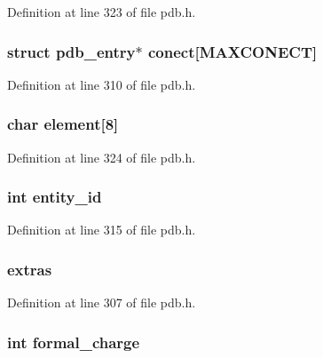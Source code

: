 Definition at line 323 of file pdb.\-h.

\hypertarget{structpdb__entry_a6115e9a0a6109e8dce256fa256fd3dc9}{
\subsubsection[{conect}]{\setlength{\rightskip}{0pt plus 5cm}struct {\bf pdb\-\_\-entry}$\ast$ conect\mbox{[}{\bf M\-A\-X\-C\-O\-N\-E\-C\-T}\mbox{]}}}\label{structpdb__entry_a6115e9a0a6109e8dce256fa256fd3dc9}


Definition at line 310 of file pdb.\-h.

\hypertarget{structpdb__entry_a780be116469a48c4b1d531bafb335f99}{
\subsubsection[{element}]{\setlength{\rightskip}{0pt plus 5cm}char element\mbox{[}8\mbox{]}}}\label{structpdb__entry_a780be116469a48c4b1d531bafb335f99}


Definition at line 324 of file pdb.\-h.

\hypertarget{structpdb__entry_add86dc86465724759eb6939ffa489005}{
\subsubsection[{entity\-\_\-id}]{\setlength{\rightskip}{0pt plus 5cm}int entity\-\_\-id}}\label{structpdb__entry_add86dc86465724759eb6939ffa489005}


Definition at line 315 of file pdb.\-h.

\hypertarget{structpdb__entry_a65eaf0a41f0a5ac660c5fecad6d247b9}{
\subsubsection[{extras}]{ extras}}\label{structpdb__entry_a65eaf0a41f0a5ac660c5fecad6d247b9}


Definition at line 307 of file pdb.\-h.

\hypertarget{structpdb__entry_a71dd94abbd2bc0399815e99bd3d42565}{
\subsubsection[{formal\-\_\-charge}]{\setlength{\rightskip}{0pt plus 5cm}int formal\-\_\-charge}}\label{structpdb__entry_a71dd94abbd2bc0399815e99bd3d42565}


